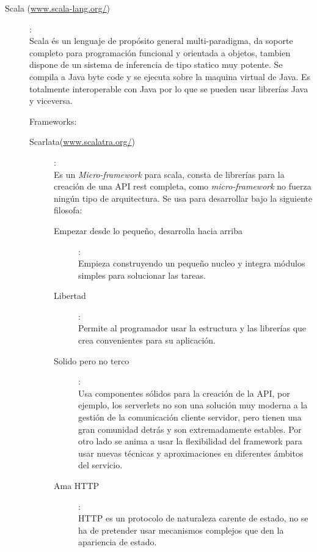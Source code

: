 \documentclass[12pt]{article} %
\begin{document}
\begin{description}
\item[Scala (\url{www.scala-lang.org/})]:
\\Scala és un lenguaje de propósito general multi-paradigma, da soporte completo para programación funcional y orientada a objetos, tambien dispone de un sistema de inferencia de tipo statico muy potente. Se compila a Java byte code y se ejecuta sobre la maquina virtual de Java. Es totalmente interoperable con Java por lo que se pueden usar librerías Java y viceversa.

Frameworks:
\begin{description}
\item[Scarlata(\url{www.scalatra.org/})]:
\\Es un \textit{Micro-framework} para scala, consta de librerías para la creación de una API rest completa, como \textit{micro-framework} no fuerza ningún tipo de arquitectura. Se usa para desarrollar bajo la siguiente filosofa:
\begin{description}
\item[Empezar desde lo pequeño, desarrolla hacia arriba]: \\Empieza construyendo un pequeño nucleo y integra módulos simples para solucionar las tareas.
\item[Libertad]: \\Permite al programador usar la estructura y las librerías que crea convenientes para su aplicación.
\item[Solido pero no terco]: \\Usa componentes sólidos para la creación de la API, por ejemplo, los serverlets no son una solución muy moderna a la gestión de la comunicación cliente servidor, pero tienen una gran comunidad detrás y son extremadamente estables. Por otro lado se anima a usar la flexibilidad del framework para usar nuevas técnicas y aproximaciones en diferentes ámbitos del servicio. 
\item[Ama HTTP]: \\HTTP es un protocolo de naturaleza carente de estado, no se ha de pretender usar mecanismos complejos que den la apariencia de estado.
\end{description}


\end{description}
\end{description}
\end{document}
